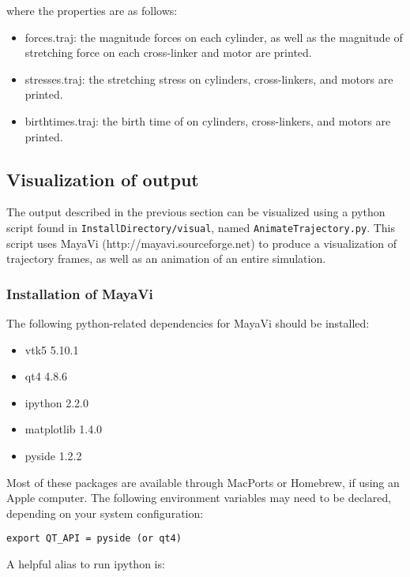 \documentclass[11pt, oneside]{article}   	%
\begin{document}
\noindent where the properties are as follows:
\begin{itemize}
\item forces.traj: the magnitude forces on each cylinder, as well as the magnitude of stretching force on each cross-linker and motor are printed.
\item stresses.traj: the stretching stress on cylinders, cross-linkers, and motors are printed.
\item birthtimes.traj: the birth time of on cylinders, cross-linkers, and motors are printed.

\end{itemize}

\subsection{Visualization of output}

The output described in the previous section can be visualized using a python script found in \texttt{InstallDirectory/visual}, named \texttt{AnimateTrajectory.py}. This script uses MayaVi (http://mayavi.sourceforge.net) to produce a visualization of trajectory frames, as well as an animation of an entire simulation.

\subsubsection{Installation of MayaVi}

The following python-related dependencies for MayaVi should be installed:
\begin{itemize}
\item vtk5 5.10.1
\item qt4 4.8.6
\item ipython 2.2.0
\item matplotlib 1.4.0
\item pyside 1.2.2
\end{itemize}

\noindent Most of these packages are available through MacPorts or Homebrew, if using an Apple computer. The following environment variables
may need to be declared, depending on your system configuration:\newline

\texttt{export QT\_API = pyside (or qt4)}\newline

\noindent A helpful alias to run ipython is:\newline
\end{document}
